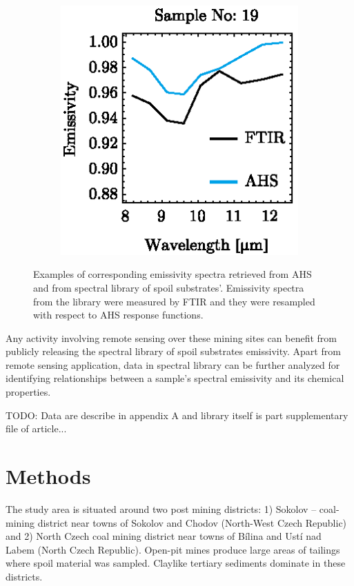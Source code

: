 \begin{figure}[!t]
\begin{subfigure}[t]{.3\linewidth}
		\includegraphics[scale=1]{pics/Chapter_05/Sample_no_19.eps}
		\caption{}
	\end{subfigure}
	\vspace{1.5 em}
	\caption{Examples of corresponding emissivity spectra retrieved from AHS and from spectral library of spoil substrates’. Emissivity spectra from the library were measured by FTIR and they were resampled with respect to AHS response functions. }
	\label{fig:AHSvsFTIRcomparison}
\end{figure}

Any activity involving remote sensing over these mining sites can benefit from publicly releasing the spectral library of spoil substrates emissivity. Apart from remote sensing application, data in spectral library can be further analyzed for identifying relationships between a sample’s spectral emissivity and its chemical properties.

TODO: Data are describe in appendix A and library itself is part supplementary file of article...

\section{Methods}

The study area is situated around two post mining districts: 1) Sokolov – coal-mining district near towns of Sokolov and Chodov (North-West Czech Republic) and 2) North Czech coal mining district near towns of Bílina and Ustí nad Labem (North Czech Republic). Open-pit mines produce large areas of tailings where spoil material was sampled. Claylike tertiary sediments dominate in these districts.

